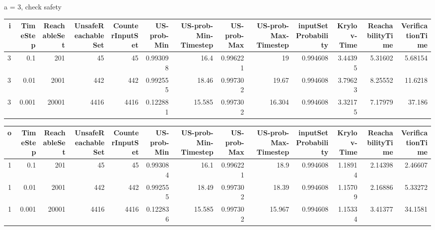 a = 3, check safety
\begin{tabular}{rrrrrrrrrrrrr}
\hline
   i &   TimeStep &   ReachableSet &   UnsafeReachableSet &   CounterInputSet &   US-prob-Min &   US-prob-Min-Timestep &   US-prob-Max &   US-prob-Max-Timestep &   inputSet Probability &   Krylov-Time &   ReachabilityTime &   VerificationTime \\
\hline
   3 &      0.1   &            201 &                   45 &                45 &      0.993098 &                 16.4   &      0.996221 &                 19     &               0.994608 &       3.44395 &            5.31602 &            5.68154 \\
   3 &      0.01  &           2001 &                  442 &               442 &      0.992555 &                 18.46  &      0.997302 &                 19.67  &               0.994608 &       3.79623 &            8.25552 &           11.6218  \\
   3 &      0.001 &          20001 &                 4416 &              4416 &      0.122881 &                 15.585 &      0.997302 &                 16.304 &               0.994608 &       3.32175 &            7.17979 &           37.186   \\
\hline
\end{tabular}
\begin{tabular}{rrrrrrrrrrrrr}
\hline
   o &   TimeStep &   ReachableSet &   UnsafeReachableSet &   CounterInputSet &   US-prob-Min &   US-prob-Min-Timestep &   US-prob-Max &   US-prob-Max-Timestep &   inputSet Probability &   Krylov-Time &   ReachabilityTime &   VerificationTime \\
\hline
   1 &      0.1   &            201 &                   45 &                45 &      0.993084 &                 16.1   &      0.996221 &                 18.9   &               0.994608 &       1.18914 &            2.14398 &            2.46607 \\
   1 &      0.01  &           2001 &                  442 &               442 &      0.992555 &                 18.49  &      0.997302 &                 18.39  &               0.994608 &       1.15709 &            2.16886 &            5.33272 \\
   1 &      0.001 &          20001 &                 4416 &              4416 &      0.122836 &                 15.585 &      0.997302 &                 15.967 &               0.994608 &       1.15334 &            3.41377 &           34.1581  \\
\hline
\end{tabular}
